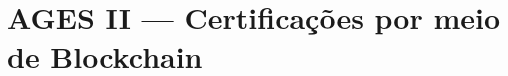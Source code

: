 \chapter[AGES II --- Certificações por meio de Blockchain]{AGES II --- Certificações por meio de Blockchain}







